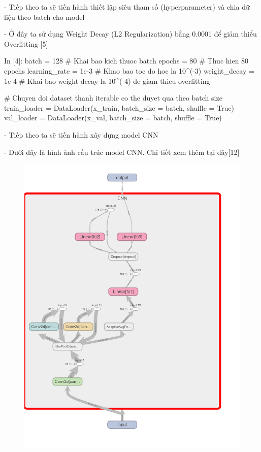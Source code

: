 \documentclass[12pt, a4paper]{article}
\begin{document}
\par - Tiếp theo ta sẽ tiến hành thiết lập siêu tham số (hyperparameter) và chia dữ liệu theo batch
cho model
\par - Ở đây ta sử dụng Weight Decay (L2 Regularization) bằng 0.0001 để giảm thiểu Overfitting [5]


\begin{python}
In [4]: batch = 128 # Khai bao kich thuoc batch
        epochs = 80 # Thuc hien 80 epochs
        learning_rate = 1e-3 # Khao bao toc do hoc la 10^(-3)
        weight_decay = 1e-4 # Khai bao weight decay la 10^(-4) de giam thieu overfitting
        
        # Chuyen doi dataset thanh iterable co the duyet qua theo batch size 
        train_loader = DataLoader(x_train, batch_size = batch, shuffle = True)
        val_loader = DataLoader(x_val, batch_size = batch, shuffle = True)
\end{python}
\par - Tiếp theo ta sẽ tiến hành xây dựng model CNN
\par - Dưới đây là hình ảnh cấu trúc model CNN. Chi tiết xem thêm tại đây[12]
\newpage
\begin{figure}[h] %
    \centering
    \includegraphics[scale = 0.2]{Img/Flowers/P1.png}
\end{figure}
\end{document}
